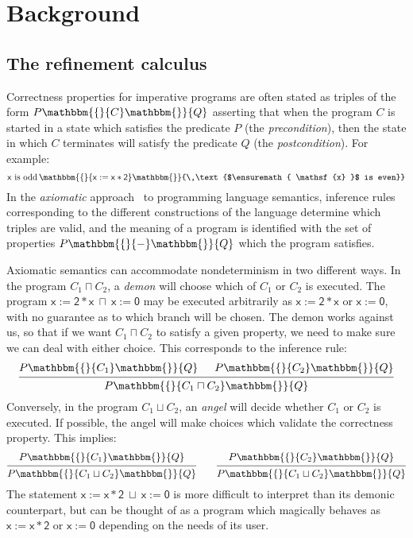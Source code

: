 \documentclass[draft,11pt]{report}
\newcommand{\kw}[1]{\ensuremath{ \mathsf{#1} }}
\newcommand{\htr}[3]{{ {#1} \mathbbm{\{} {#2} \mathbbm{\}} {#3} }}
\begin{document}

\chapter{Background} %

\section{The refinement calculus} %


Correctness properties for imperative programs
are often stated as triples of the form $\htr{P}{C}{Q}$
asserting that
when the program $C$ is started in a state which
satisfies the predicate $P$ (the \emph{precondition}),
then the state in which $C$ terminates
will satisfy the predicate $Q$ (the \emph{postcondition}).
For example:
\[
    \htr{\text{$\kw{x}$ is odd}\,}{\kw{x := x * 2}}{\,\text{$\kw{x}$ is even}}
\]
In the \emph{axiomatic} approach~\cite{hoare69} to programming language semantics,
inference rules
corresponding to the different constructions of the language
determine which triples are valid,
and the meaning of a program is identified with
the set of properties $\htr{P}{-}{Q}$
which the program satisfies.

Axiomatic semantics
can accommodate nondeterminism in two different ways.
In the program $C_1 \sqcap C_2$,
a \emph{demon} will choose which of $C_1$ or $C_2$ is executed.
The program $\kw{x := 2 * x} \: \sqcap \: \kw{x := 0}$
may be executed arbitrarily as $\kw{x := 2 * x}$ or $\kw{x := 0}$,
with no guarantee as to which branch will be chosen.
The demon works against us,
so that if we want $C_1 \sqcap C_2$ to satisfy a given property,
we need to make sure we can deal with either choice.
This corresponds to the inference rule:
\[
  \begin{prooftree}
    \hypo{\htr{P}{C_1}{Q}}
    \hypo{\htr{P}{C_2}{Q}}
    \infer2{\htr{P}{C_1 \sqcap C_2}{Q}}
  \end{prooftree}
\]
Conversely,
in the program $C_1 \sqcup C_2$,
an \emph{angel} will decide whether $C_1$ or $C_2$ is executed.
If possible,
the angel will make choices which validate
the correctness property.
This implies:
\[
  \begin{prooftree}
    \hypo{\htr{P}{C_1}{Q}}
    \infer1{\htr{P}{C_1 \sqcup C_2}{Q}}
  \end{prooftree}
  \qquad
  \begin{prooftree}
    \hypo{\htr{P}{C_2}{Q}}
    \infer1{\htr{P}{C_1 \sqcup C_2}{Q}}
  \end{prooftree}
\]
The statement $\kw{x := x * 2} \: \sqcup \: \kw{x := 0}$
is more difficult to interpret than its demonic counterpart,
but can be thought of as a program which magically behaves as
$\kw{x := x * 2}$ or $\kw{x := 0}$
depending on the needs of its user.
\end{document}
